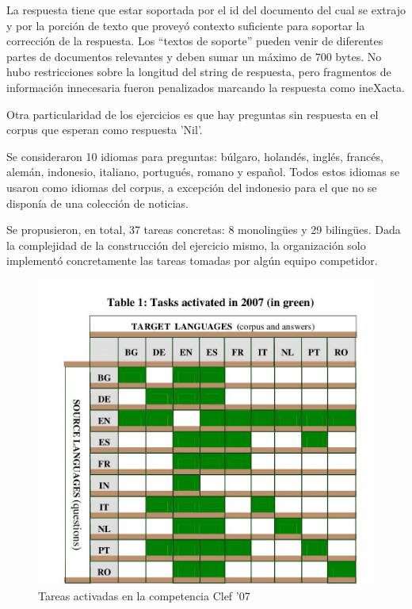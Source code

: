La respuesta tiene que estar soportada por el id del documento del cual se extrajo y por la porción de texto que proveyó contexto suficiente para soportar la corrección de la respuesta. Los “textos de soporte” pueden venir de diferentes partes de documentos relevantes y deben sumar un máximo de 700 bytes. No hubo restricciones sobre la longitud del string de respuesta, pero fragmentos de información innecesaria fueron penalizados marcando la respuesta como ineXacta.

Otra particularidad de los ejercicios es que hay preguntas sin respuesta en el corpus que esperan como respuesta 'Nil'.


Se consideraron 10 idiomas para preguntas: búlgaro, holandés, inglés, francés, alemán, indonesio, italiano, portugués, romano y español. Todos estos idiomas se usaron como idiomas del corpus, a excepción del indonesio para el que no se disponía de una colección de noticias.

Se propusieron, en total, 37 tareas concretas: 8 monolingües y 29 bilingües. Dada la complejidad de la construcción del ejercicio mismo, la organización solo implementó concretamente las tareas tomadas por algún equipo competidor.


\begin{figure}
  \centering
    \includegraphics[scale=0.5]{graficos/clef07}
  \caption{Tareas activadas en la competencia Clef '07}
  \label{fig:tareas}
\end{figure}

